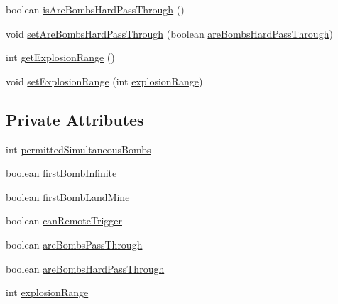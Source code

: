 \begin{DoxyCompactItemize}
\item 
boolean \hyperlink{classbr_1_1unb_1_1unbomber_1_1component_1_1_bomb_dropper_a32f90e390512297fe21387f0f97e5371}{is\+Are\+Bombs\+Hard\+Pass\+Through} ()
\item 
void \hyperlink{classbr_1_1unb_1_1unbomber_1_1component_1_1_bomb_dropper_a59de96dee310e34218fc50c7b9fe9a38}{set\+Are\+Bombs\+Hard\+Pass\+Through} (boolean \hyperlink{classbr_1_1unb_1_1unbomber_1_1component_1_1_bomb_dropper_ae2a556a5118e9e54b93789ba7c53d18d}{are\+Bombs\+Hard\+Pass\+Through})
\item 
int \hyperlink{classbr_1_1unb_1_1unbomber_1_1component_1_1_bomb_dropper_a3a35cccfc88116b6e6e83732d57e46c3}{get\+Explosion\+Range} ()
\item 
void \hyperlink{classbr_1_1unb_1_1unbomber_1_1component_1_1_bomb_dropper_a14f76fe516928c678732c6762ad86529}{set\+Explosion\+Range} (int \hyperlink{classbr_1_1unb_1_1unbomber_1_1component_1_1_bomb_dropper_a665211e84d5762ffd425d1180c6084fb}{explosion\+Range})
\end{DoxyCompactItemize}
\subsection*{Private Attributes}
\begin{DoxyCompactItemize}
\item 
int \hyperlink{classbr_1_1unb_1_1unbomber_1_1component_1_1_bomb_dropper_a69e0a914f0a36bac6ee0e17ad1d877c5}{permitted\+Simultaneous\+Bombs}
\item 
boolean \hyperlink{classbr_1_1unb_1_1unbomber_1_1component_1_1_bomb_dropper_a4f457c4178392c5b1ac88e84e339bc23}{first\+Bomb\+Infinite}
\item 
boolean \hyperlink{classbr_1_1unb_1_1unbomber_1_1component_1_1_bomb_dropper_ace7b7bfe607b23975b069ffec9efb105}{first\+Bomb\+Land\+Mine}
\item 
boolean \hyperlink{classbr_1_1unb_1_1unbomber_1_1component_1_1_bomb_dropper_ac5b6711b5ee70d27c401ebeff1cec914}{can\+Remote\+Trigger}
\item 
boolean \hyperlink{classbr_1_1unb_1_1unbomber_1_1component_1_1_bomb_dropper_ac85697fd5434f276d05378ec8c224e42}{are\+Bombs\+Pass\+Through}
\item 
boolean \hyperlink{classbr_1_1unb_1_1unbomber_1_1component_1_1_bomb_dropper_ae2a556a5118e9e54b93789ba7c53d18d}{are\+Bombs\+Hard\+Pass\+Through}
\item 
int \hyperlink{classbr_1_1unb_1_1unbomber_1_1component_1_1_bomb_dropper_a665211e84d5762ffd425d1180c6084fb}{explosion\+Range}
\end{DoxyCompactItemize}


